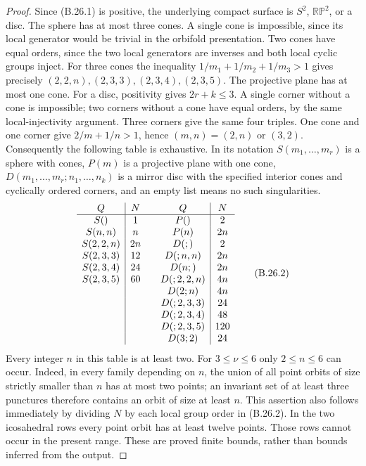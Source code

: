\begin{proof}
Since (B.26.1) is positive, the underlying compact surface is $S^2$,
$\mathbb{RP}^2$, or a disc.  The sphere has at most three cones.  A
single cone is impossible, since its local generator would be trivial
in the orbifold presentation.  Two cones have equal orders, since the
two local generators are inverses and both local cyclic groups inject.
For three cones the inequality $1/m_1+1/m_2+1/m_3>1$ gives precisely
$(2,2,n),(2,3,3),(2,3,4),(2,3,5)$.
The projective plane has at most one cone.  For a disc, positivity gives
$2r+k\le3$.  A single corner without a cone is impossible; two corners
without a cone have equal orders, by the same local-injectivity argument.
Three corners give the same four triples.  One cone and one corner
give $2/m+1/n>1$, hence $(m,n)=(2,n)$ or $(3,2)$.
Consequently the following table is exhaustive.  In its notation
$S(m_1,\ldots,m_r)$ is a sphere with cones, $P(m)$ is a projective
plane with one cone, $D(m_1,\ldots,m_r;n_1,\ldots,n_k)$ is a mirror
disc with the specified interior cones and cyclically ordered corners,
and an empty list means no such singularities.
\[
\begin{array}{c|c@{\qquad}c|c}
Q&N&Q&N\\\hline
S()&1&P()&2\\
S(n,n)&n&P(n)&2n\\
S(2,2,n)&2n&D(;)&2\\
S(2,3,3)&12&D(;n,n)&2n\\
S(2,3,4)&24&D(n;)&2n\\
S(2,3,5)&60&D(;2,2,n)&4n\\
&&D(2;n)&4n\\
&&D(;2,3,3)&24\\
&&D(;2,3,4)&48\\
&&D(;2,3,5)&120\\
&&D(3;2)&24
\end{array}                                                   \tag{B.26.2}
\]
Every integer $n$ in this table is at least two.  For $3\le\nu\le6$
only $2\le n\le6$ can occur.  Indeed, in every family depending on
$n$, the union of all point orbits of size strictly smaller than $n$
has at most two points; an invariant set of at least three punctures
therefore contains an orbit of size at least $n$.  This assertion also
follows immediately by dividing $N$ by each local group order in
(B.26.2).  In the two icosahedral rows every point orbit has at least
twelve points.  Those rows cannot occur in the present range.  These
are proved finite bounds, rather than bounds inferred from the output.


\end{proof}
